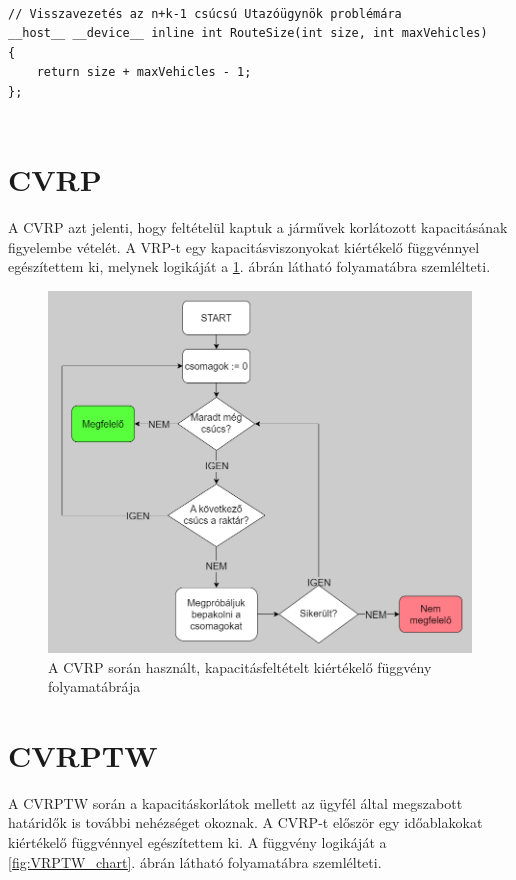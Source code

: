 \begin{lstlisting}[style=CStyle,showstringspaces=false]
	
// Visszavezetés az n+k-1 csúcsú Utazóügynök problémára
__host__ __device__ inline int RouteSize(int size, int maxVehicles)
{
	return size + maxVehicles - 1;
};	
	
\end{lstlisting} 

\section{CVRP}

A CVRP azt jelenti, hogy feltételül kaptuk a járművek korlátozott kapacitásának figyelembe vételét. A VRP-t egy kapacitásviszonyokat kiértékelő függvénnyel egészítettem ki, melynek logikáját a \ref{fig:CVRP_chart}. ábrán látható folyamatábra szemlélteti.

\begin{figure}[ht!]
	\centering
	\includegraphics[width=150mm, keepaspectratio]{figures/Capacity.drawio.png}
	\caption{A CVRP során használt, kapacitásfeltételt kiértékelő függvény folyamatábrája }
	\label{fig:CVRP_chart}
\end{figure}

\section{CVRPTW}

A CVRPTW során a kapacitáskorlátok mellett az ügyfél által megszabott határidők is további nehézséget okoznak. A CVRP-t először egy időablakokat kiértékelő függvénnyel egészítettem ki. A függvény logikáját a \ref{fig:VRPTW_chart}. ábrán látható folyamatábra szemlélteti.

